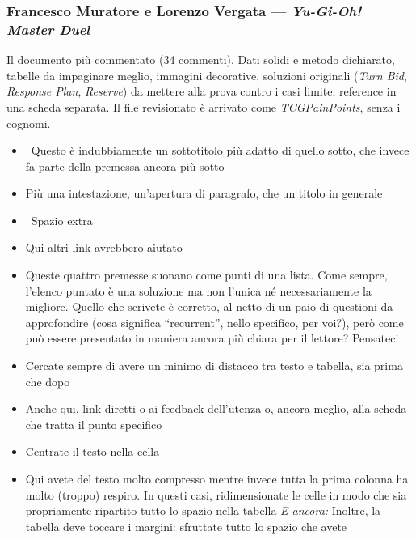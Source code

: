 \subsubsection{Francesco Muratore e Lorenzo Vergata --- \emph{Yu-Gi-Oh!
Master Duel}}
Il documento più commentato (34 commenti). Dati solidi e metodo dichiarato,
tabelle da impaginare meglio, immagini decorative, soluzioni originali
(\emph{Turn Bid}, \emph{Response Plan}, \emph{Reserve}) da mettere alla
prova contro i casi limite; reference in una scheda separata. Il file
revisionato è arrivato come \emph{TCGPainPoints}, senza i cognomi.
{\small
\begin{itemize}
  \item {} \rvBene\ Questo è indubbiamente un sottotitolo più adatto di quello sotto, che invece fa parte della premessa ancora più sotto
  \item {} Più una intestazione, un'apertura di paragrafo, che un titolo in generale
  \item \rvVuoto\ Spazio extra
  \item {} Qui altri link avrebbero aiutato
  \item {} Queste quattro premesse suonano come punti di una lista. Come sempre, l'elenco puntato è una soluzione ma non l'unica né necessariamente la migliore. Quello che scrivete è corretto, al netto di un paio di questioni da approfondire (cosa significa ``recurrent'', nello specifico, per voi?), però come può essere presentato in maniera ancora più chiara per il lettore? Pensateci
  \item {} Cercate sempre di avere un minimo di distacco tra testo e tabella, sia prima che dopo
  \item {} Anche qui, link diretti o ai feedback dell'utenza o, ancora meglio, alla scheda che tratta il punto specifico
  \item {} Centrate il testo nella cella
  \item {} Qui avete del testo molto compresso mentre invece tutta la prima colonna ha molto (troppo) respiro. In questi casi, ridimensionate le celle in modo che sia propriamente ripartito tutto lo spazio nella tabella \emph{E ancora:} Inoltre, la tabella deve toccare i margini: sfruttate tutto lo spazio che avete

\end{itemize}}
